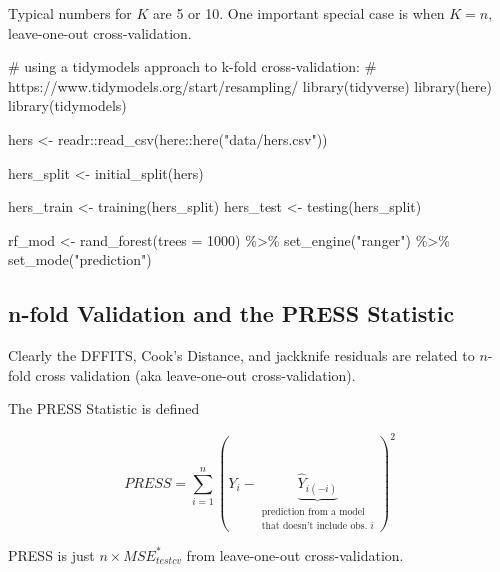 \documentclass[
  letterpaper,
  DIV=11,
  numbers=noendperiod]{scrreport}
\newenvironment{Shaded}{\begin{snugshade}}{\end{snugshade}}
\newcommand{\AttributeTok}[1]{\textcolor[rgb]{0.40,0.45,0.13}{#1}}
\newcommand{\CommentTok}[1]{\textcolor[rgb]{0.37,0.37,0.37}{#1}}
\newcommand{\DecValTok}[1]{\textcolor[rgb]{0.68,0.00,0.00}{#1}}
\newcommand{\FunctionTok}[1]{\textcolor[rgb]{0.28,0.35,0.67}{#1}}
\newcommand{\NormalTok}[1]{\textcolor[rgb]{0.00,0.23,0.31}{#1}}
\newcommand{\OtherTok}[1]{\textcolor[rgb]{0.00,0.23,0.31}{#1}}
\newcommand{\SpecialCharTok}[1]{\textcolor[rgb]{0.37,0.37,0.37}{#1}}
\newcommand{\StringTok}[1]{\textcolor[rgb]{0.13,0.47,0.30}{#1}}
\begin{document}
Typical numbers for \(K\) are 5 or 10. One important special case is
when \(K = n\), leave-one-out cross-validation.

\begin{Shaded}
\begin{Highlighting}[]
\CommentTok{\# using a tidymodels approach to k{-}fold cross{-}validation: }
\CommentTok{\# https://www.tidymodels.org/start/resampling/ }
\FunctionTok{library}\NormalTok{(tidyverse)}
\FunctionTok{library}\NormalTok{(here)}
\FunctionTok{library}\NormalTok{(tidymodels)}

\NormalTok{hers }\OtherTok{\textless{}{-}}\NormalTok{ readr}\SpecialCharTok{::}\FunctionTok{read\_csv}\NormalTok{(here}\SpecialCharTok{::}\FunctionTok{here}\NormalTok{(}\StringTok{"data/hers.csv"}\NormalTok{))}

\NormalTok{hers\_split }\OtherTok{\textless{}{-}} \FunctionTok{initial\_split}\NormalTok{(hers)}

\NormalTok{hers\_train }\OtherTok{\textless{}{-}} \FunctionTok{training}\NormalTok{(hers\_split)}
\NormalTok{hers\_test  }\OtherTok{\textless{}{-}} \FunctionTok{testing}\NormalTok{(hers\_split)}

\NormalTok{rf\_mod }\OtherTok{\textless{}{-}} 
  \FunctionTok{rand\_forest}\NormalTok{(}\AttributeTok{trees =} \DecValTok{1000}\NormalTok{) }\SpecialCharTok{\%\textgreater{}\%} 
  \FunctionTok{set\_engine}\NormalTok{(}\StringTok{"ranger"}\NormalTok{) }\SpecialCharTok{\%\textgreater{}\%} 
  \FunctionTok{set\_mode}\NormalTok{(}\StringTok{"prediction"}\NormalTok{)}
\end{Highlighting}
\end{Shaded}

\hypertarget{n-fold-validation-and-the-press-statistic}{%
\subsection{n-fold Validation and the PRESS
Statistic}\label{n-fold-validation-and-the-press-statistic}}

Clearly the DFFITS, Cook's Distance, and jackknife residuals are related
to \(n\)-fold cross validation (aka leave-one-out cross-validation).

The PRESS Statistic is defined

\[PRESS = \sum_{i=1}^n \left(Y_i - \underbrace{\hat Y_{i(-i)}}_{\substack{\text{prediction from a model} \\ \text{that doesn't include obs. } i}}\right)^2\]

PRESS is just \(n \times MSE_{testcv}^*\) from leave-one-out
cross-validation.
\end{document}
